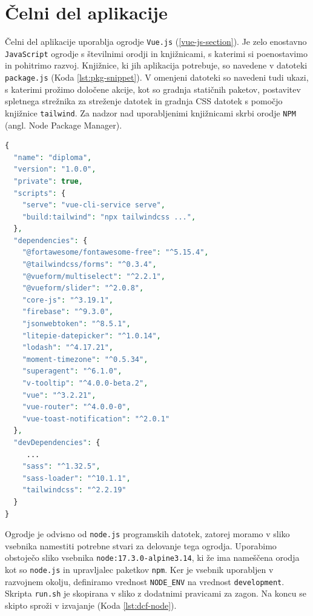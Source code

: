 \documentclass[a4paper, 12pt]{book}
\begin{document}
\section{Čelni del aplikacije}
Čelni del aplikacije uporablja ogrodje \verb=Vue.js= (\ref{vue-js-section}). Je zelo enostavno \verb=JavaScript= ogrodje s številnimi orodji in knjižnicami, s katerimi si poenostavimo in pohitrimo razvoj. Knjižnice, ki jih aplikacija potrebuje, so navedene v datoteki \verb=package.js= (Koda \ref{lst:pkg-snippet}). V omenjeni datoteki so navedeni tudi ukazi, s katerimi prožimo določene akcije, kot so gradnja statičnih paketov, postavitev spletnega strežnika za streženje datotek in gradnja CSS datotek s pomočjo knjižnice \verb=tailwind=. Za nadzor nad uporabljenimi knjižnicami skrbi orodje \verb=NPM= (angl. Node Package Manager).

\begin{lstlisting}[language=php, style=mystyle,caption={Izsek naštetih knjižnic in ukazov v datoteki package.json},label=lst:pkg-snippet]
{
  "name": "diploma",
  "version": "1.0.0",
  "private": true,
  "scripts": {
    "serve": "vue-cli-service serve",
    "build:tailwind": "npx tailwindcss ...",
  },
  "dependencies": {
    "@fortawesome/fontawesome-free": "^5.15.4",
    "@tailwindcss/forms": "^0.3.4",
    "@vueform/multiselect": "^2.2.1",
    "@vueform/slider": "^2.0.8",
    "core-js": "^3.19.1",
    "firebase": "^9.3.0",
    "jsonwebtoken": "^8.5.1",
    "litepie-datepicker": "^1.0.14",
    "lodash": "^4.17.21",
    "moment-timezone": "^0.5.34",
    "superagent": "^6.1.0",
    "v-tooltip": "^4.0.0-beta.2",
    "vue": "^3.2.21",
    "vue-router": "^4.0.0-0",
    "vue-toast-notification": "^2.0.1"
  },
  "devDependencies": {
     ...
    "sass": "^1.32.5",
    "sass-loader": "^10.1.1",
    "tailwindcss": "^2.2.19"
  }
}

\end{lstlisting}



Ogrodje je odvisno od \verb=node.js= programskih datotek, zatorej moramo v sliko vsebnika namestiti potrebne stvari za delovanje tega ogrodja. Uporabimo obstoječo sliko vsebnika \texttt{node:17.3.0-alpine3.14}, ki že ima nameščena orodja kot so \texttt{node.js} in upravljalec paketkov \texttt{npm}. Ker je vsebnik uporabljen v razvojnem okolju, definiramo vrednost \texttt{NODE\_ENV} na vrednost \texttt{development}. Skripta \texttt{run.sh} je skopirana v sliko z dodatnimi pravicami za zagon. Na koncu se skipto sproži v izvajanje (Koda \ref{lst:dcf-node}).
\end{document}
